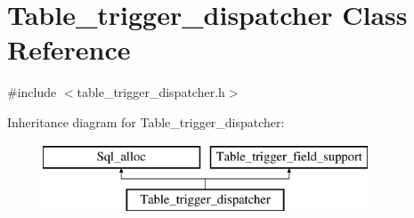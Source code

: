 \hypertarget{classTable__trigger__dispatcher}{}\section{Table\+\_\+trigger\+\_\+dispatcher Class Reference}
\label{classTable__trigger__dispatcher}


{\ttfamily \#include $<$table\+\_\+trigger\+\_\+dispatcher.\+h$>$}

Inheritance diagram for Table\+\_\+trigger\+\_\+dispatcher\+:\begin{figure}[H]
\begin{center}
\leavevmode
\includegraphics[height=2.000000cm]{classTable__trigger__dispatcher}
\end{center}
\end{figure}
